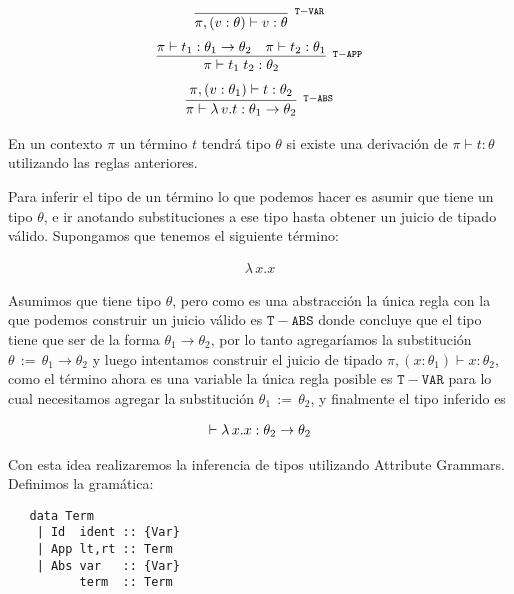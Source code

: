\documentclass[a4paper,10pt]{article}
\newcommand{\typejud}[3] {
  \ensuremath{#1 \vdash #2 : #3}
}
\begin{document}
 \begin{align*}
 \infer[^{\mathtt{T-VAR}}]
       {\typejud{\pi,(v:\theta)}{v}{\theta}}
       {}
 \end{align*}
  \begin{align*}
  \infer[^{\mathtt{T-APP}}]
       {\typejud{\pi}{t_1\;t_2}{\theta_2}}
       {\typejud{\pi}{t_1}{\theta_1\rightarrow\theta_2} &
        \typejud{\pi}{t_2}{\theta_1}
       }
  \end{align*}
  \begin{align*}
  \infer[^{\mathtt{T-ABS}}]
       {\typejud{\pi}{\lambda\,v.t}{\theta_1 \rightarrow \theta_2}}
       {\typejud{\pi,(v:\theta_1)}{t}{\theta_2}
       }
  \end{align*}
 
 En un contexto $\pi$ un término $t$ tendrá tipo $\theta$ si existe una derivación de
 $\typejud{\pi}{t}{\theta}$ utilizando las reglas anteriores.
 
 Para inferir el tipo de un término lo que podemos hacer es asumir que tiene un tipo $\theta$, e ir anotando
 substituciones a ese tipo hasta obtener un juicio de tipado válido. Supongamos que tenemos el siguiente término:
 
 \begin{align*}
    \lambda\,x.x
 \end{align*}

  Asumimos que tiene tipo $\theta$, pero como es una abstracción la única regla con la que podemos construir un juicio
  válido es $\mathtt{T-ABS}$ donde concluye que el tipo tiene que ser de la forma $\theta_1 \rightarrow \theta_2$, 
  por lo tanto agregaríamos la substitución $\theta\,:=\,\theta_1 \rightarrow \theta_2$ y luego
  intentamos construir el juicio de tipado $\typejud{\pi,(x:\theta_1)}{x}{\theta_2}$, como el término ahora
  es una variable la única regla posible es $\mathtt{T-VAR}$ para lo cual necesitamos agregar
  la substitución $\theta_1\,:=\,\theta_2$, y finalmente el tipo inferido es
  
  \begin{align*}
   \typejud{\empty}{\lambda\,x.x}{\theta_2 \rightarrow \theta_2}
  \end{align*}

  Con esta idea realizaremos la inferencia de tipos utilizando Attribute Grammars. Definimos la gramática:
  
  \begin{lstlisting}
   data Term
	| Id  ident :: {Var}
	| App lt,rt :: Term
	| Abs var   :: {Var}
	      term  :: Term
  \end{lstlisting}
\end{document}
